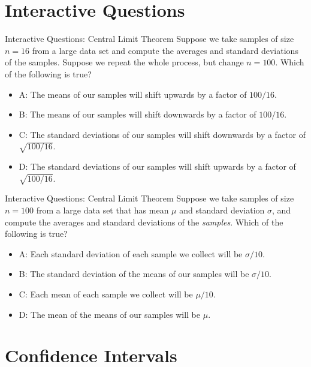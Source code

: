 \documentclass{beamer}
\begin{document}
\section{Interactive Questions}

\begin{frame}{Interactive Questions: Central Limit Theorem}
Suppose we take samples of size $n = 16$ from a large data set and compute the averages and standard deviations of the samples.  Suppose we repeat the whole process, but change $n = 100$.  Which of the following is true?
\begin{itemize}
\item A: The means of our samples will shift upwards by a factor of $100/16$.
\item B: The means of our samples will shift downwards by a factor of $100/16$.
\item C: The standard deviations of our samples will shift downwards by a factor of $\sqrt{100/16}$.
\item D: The standard deviations of our samples will shift upwards by a factor of $\sqrt{100/16}$.
\end{itemize}
\end{frame}

\begin{frame}{Interactive Questions: Central Limit Theorem}
Suppose we take samples of size $n = 100$ from a large data set that has mean $\mu$ and standard deviation $\sigma$, and compute the averages and standard deviations of the \textit{samples}.  Which of the following is true?
\begin{itemize}
\item A: Each standard deviation of each sample we collect will be $\sigma/10$.
\item B: The standard deviation of the means of our samples will be $\sigma/10$.
\item C: Each mean of each sample we collect will be $\mu/10$.
\item D: The mean of the means of our samples will be $\mu$.
\end{itemize}
\end{frame}

\section{Confidence Intervals}
\end{document}
